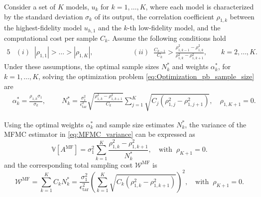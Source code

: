 %
\begin{theorem}
\label{thm:Sample_size_est}
Consider a set of $K$ models, $u_k$ for $k=1,\ldots,K$, where each model is characterized by the standard deviation $\sigma_k$ of its output, the correlation coefficient $\rho_{1,k}$ between the highest-fidelity model $u_{h,1}$ and the $k$-th low-fidelity model, and the computational cost per sample $C_k$. Assume the following conditions hold
%
\begin{alignat*}{5}
    &(i)\;\; |\rho_{1,1}|>\ldots>|\rho_{1,K}|,& \qquad \qquad
    &(ii)\;\; \frac{C_{k-1}}{C_k}>\frac{\rho_{1,k-1}^2-\rho_{1,k}^2}{\rho_{1,k}^2-\rho_{1,k+1}^2},\quad \quad k=2,\ldots,K.
\end{alignat*}
%
Under these assumptions, the optimal sample sizes $N_k^*$ and weights $\alpha_k^*$, for $k=1,\ldots, K$, solving the optimization problem \eqref{eq:Optimization_pb_sample_size} are
%
\begin{align}
    \label{eq:MFMC_SampleSize}
    &\alpha_k^*=\frac{\rho_{1,k}\sigma_1}{\sigma_k},\qquad \;N_k^*=\frac{\sigma_1^2}{\epsilon_\text{tar}^2}\sqrt{\frac{\rho_{1,k}^2-\rho_{1,k+1}^2}{C_k}}\sum_{j=1}^K\sqrt{C_j\left(\rho_{1,j}^2-\rho_{1,j+1}^2\right)}, \quad \rho_{1,K+1}=0.
\end{align}
%

Using the optimal weights $\alpha_k^*$ and sample size estimates $N_k^*$, the variance of the MFMC estimator in \eqref{eq:MFMC_variance} can be expressed as
%
\begin{equation}
\label{eq:MFMC_variance_optimal}
\mathbb{V}\left[A^{\text{MF}}\right] =
\sigma_1^2 \sum_{k=1}^K\frac{\rho_{1,k}^2 - \rho_{1,k+1}^2}{N_k^*},\quad \text{with}\;\;\rho_{K+1}=0.
\end{equation}
%
and the corresponding total sampling cost $\mathcal{W}^\text{MF}$ is
%
\begin{equation}\label{eq:MFMC_sampling_cost}
    \mathcal{W}^\text{MF} = \sum_{k=1}^K C_k N_k^* = \frac{\sigma_1^2}{\epsilon_{\text{tar}}^2}\left(\sum_{k=1}^K\sqrt{C_k\left(\rho_{1,k}^2 - \rho_{1,k+1}^2\right)}\right)^2,\quad \text{with}\;\;\rho_{K+1}=0.
\end{equation}
%
\end{theorem}



